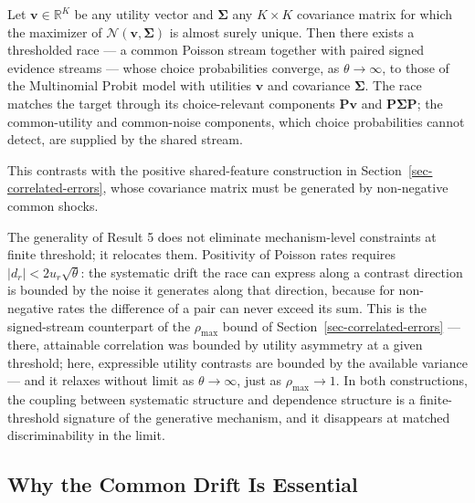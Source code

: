 \documentclass[
  man,
  floatsintext,
  longtable,
  a4paper,
  nolmodern,
  notxfonts,
  notimes,
  colorlinks=true,linkcolor=blue,citecolor=blue,urlcolor=blue]{apa7}
\begin{document}
\begin{tcolorbox}[enhanced jigsaw, colframe=quarto-callout-note-color-frame, leftrule=.75mm, colbacktitle=quarto-callout-note-color!10!white, titlerule=0mm, bottomrule=.15mm, opacityback=0, rightrule=.15mm, toptitle=1mm, bottomtitle=1mm, breakable, title={Result 5 (Signed Streams Span the Choice-Relevant Probit Class)}, arc=.35mm, coltitle=black, opacitybacktitle=0.6, left=2mm, toprule=.15mm, colback=white]

Let \(\mathbf v\in\mathbb R^K\) be any utility vector and
\(\boldsymbol\Sigma\) any \(K\times K\) covariance matrix for which the
maximizer of \(\mathcal N(\mathbf v,\boldsymbol\Sigma)\) is almost
surely unique. Then there exists a thresholded race --- a common Poisson
stream together with paired signed evidence streams --- whose choice
probabilities converge, as \(\theta\to\infty\), to those of the
Multinomial Probit model with utilities \(\mathbf v\) and covariance
\(\boldsymbol\Sigma\). The race matches the target through its
choice-relevant components \(\mathbf P\mathbf v\) and
\(\mathbf P\boldsymbol\Sigma\mathbf P\); the common-utility and
common-noise components, which choice probabilities cannot detect, are
supplied by the shared stream.

\end{tcolorbox}

This contrasts with the positive shared-feature construction in
Section~\ref{sec-correlated-errors}, whose covariance matrix must be
generated by non-negative common shocks.

The generality of Result 5 does not eliminate mechanism-level
constraints at finite threshold; it relocates them. Positivity of
Poisson rates requires \(|d_r|<2u_r\sqrt{\theta}\): the systematic drift
the race can express along a contrast direction is bounded by the noise
it generates along that direction, because for non-negative rates the
difference of a pair can never exceed its sum. This is the signed-stream
counterpart of the \(\rho_{\max}\) bound of
Section~\ref{sec-correlated-errors} --- there, attainable correlation
was bounded by utility asymmetry at a given threshold; here, expressible
utility contrasts are bounded by the available variance --- and it
relaxes without limit as \(\theta\to\infty\), just as
\(\rho_{\max}\to 1\). In both constructions, the coupling between
systematic structure and dependence structure is a finite-threshold
signature of the generative mechanism, and it disappears at matched
discriminability in the limit.

\subsection{Why the Common Drift Is
Essential}\label{why-the-common-drift-is-essential}
\end{document}
